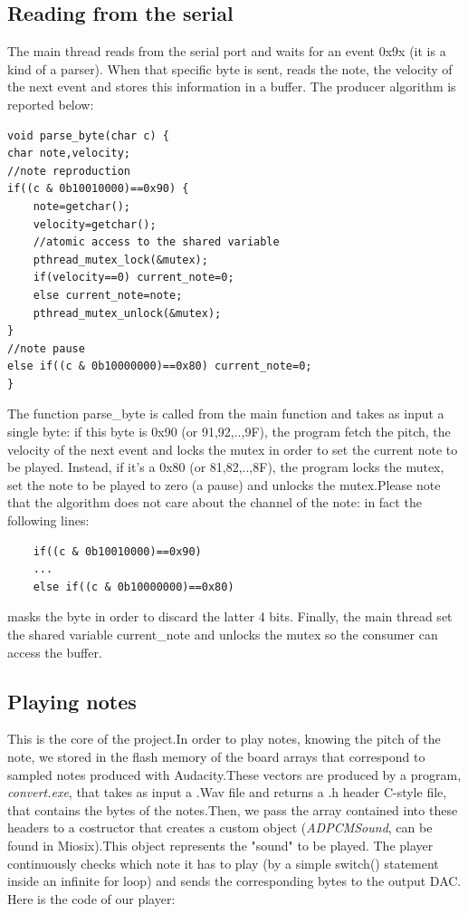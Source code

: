 \documentclass[12pt]{article}
\begin{document}
\subsection{Reading from the serial}
The main thread reads from the serial port and waits for an event 0x9x (it is a kind of a parser). When that specific byte is sent, reads the note, the velocity of the next event and stores this information in a buffer. The producer algorithm is reported below:
\begin{lstlisting}
void parse_byte(char c) {
char note,velocity;
//note reproduction
if((c & 0b10010000)==0x90) {
	note=getchar();
	velocity=getchar();
	//atomic access to the shared variable
	pthread_mutex_lock(&mutex);
	if(velocity==0) current_note=0;
	else current_note=note;
	pthread_mutex_unlock(&mutex);
}
//note pause
else if((c & 0b10000000)==0x80) current_note=0;
}
\end{lstlisting}
The function parse\_byte is called from the main function and takes as input a single byte: if this byte is 0x90 (or 91,92,..,9F), the program fetch the pitch, the velocity of the next event and locks the mutex in order to set the current note to be played. Instead, if it's a 0x80 (or 81,82,..,8F), the program locks the mutex, set the note to be played to zero (a pause) and unlocks the mutex.Please note that the algorithm does not care about the channel of the note: in fact the following lines:
\begin{lstlisting}
	if((c & 0b10010000)==0x90)
	...
	else if((c & 0b10000000)==0x80)
\end{lstlisting}
masks the byte in order to discard the latter 4 bits.\newline
Finally, the main thread set the shared variable current\_note and unlocks the mutex so the consumer can access the buffer.

\subsection{Playing notes}
This is the core of the project.In order to play notes, knowing the pitch of the note, we stored in the flash memory of the board arrays that correspond to sampled notes produced with Audacity.These vectors are produced by a program, \textit{convert.exe}, that takes as input a .Wav file and returns a .h header C-style file, that contains the bytes of the notes.Then, we pass the array contained into these headers to a costructor that creates a custom object (\textit{ADPCMSound}, can be found in Miosix).This object represents the "sound" to be played.\newline
The player continuously checks which note it has to play (by a simple switch() statement inside an infinite for loop) and sends the corresponding bytes to the output DAC. Here is the code of our player:
\end{document}
